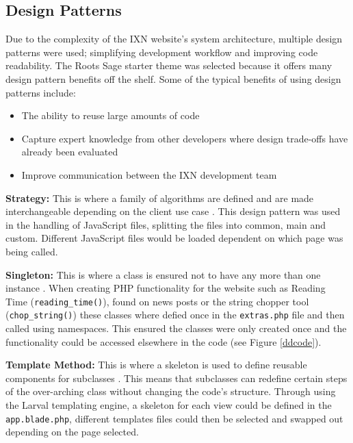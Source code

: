 \documentclass[fontsize=11pt]{extarticle}
\numberwithin{figure}{section} %
\numberwithin{table}{section}%
\providecommand{\tightlist}{%
  \setlength{\itemsep}{0pt}\setlength{\parskip}{0pt}}
\begin{document}
\hypertarget{design-patterns}{%
\subsection{Design Patterns}\label{design-patterns}}

Due to the complexity of the IXN website's system architecture, multiple
design patterns were used; simplifying development workflow and
improving code readability. The Roots Sage starter theme was selected
because it offers many design pattern benefits off the shelf. Some of
the typical benefits of using design patterns include:

\begin{itemize}
\tightlist
\item
  The ability to reuse large amounts of code \cite{deanDesignPatterns}
\item
  Capture expert knowledge from other developers where design trade-offs
  have already been evaluated
\item
  Improve communication between the IXN development team
\end{itemize}

\textbf{Strategy:} This is where a family of algorithms are defined and
are made interchangeable depending on the client use case
\cite{gamma1995design}. This design pattern was used in the handling of
JavaScript files, splitting the files into common, main and custom.
Different JavaScript files would be loaded dependent on which page was
being called.

\textbf{Singleton:} This is where a class is ensured not to have any
more than one instance \cite{gamma1995design}. When creating PHP
functionality for the website such as Reading Time
(\texttt{reading\_time()}), found on news posts or the string chopper
tool (\texttt{chop\_string()}) these classes where defied once in the
\texttt{extras.php} file and then called using namespaces. This ensured
the classes were only created once and the functionality could be
accessed elsewhere in the code (see Figure \ref{ddcode}).

\textbf{Template Method:} This is where a skeleton is used to define
reusable components for subclasses \cite{gamma1995design}. This means
that subclasses can redefine certain steps of the over-arching class
without changing the code's structure. Through using the Larval
templating engine, a skeleton for each view could be defined in the
\texttt{app.blade.php}, different templates files could then be selected
and swapped out depending on the page selected.
\end{document}
